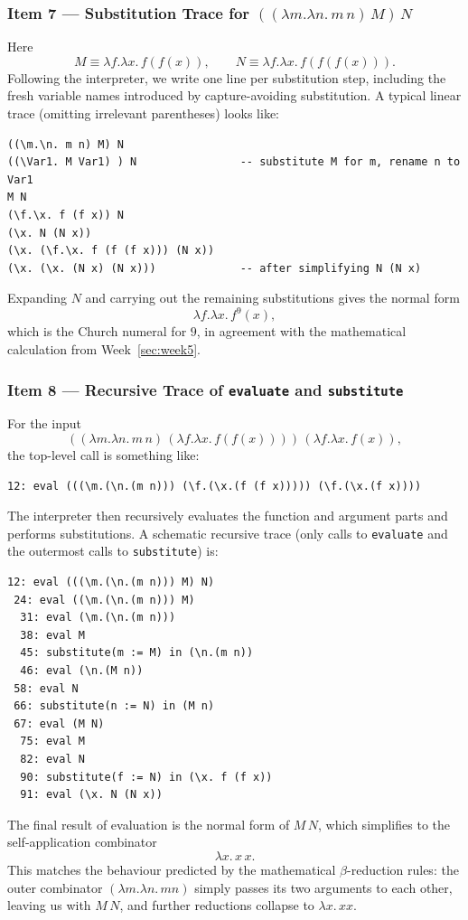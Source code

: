 \documentclass{article}
\theoremstyle{theorem}
\theoremstyle{definition}
\theoremstyle{remark}
\begin{document}
\subsubsection*{Item 7 --- Substitution Trace for \(((\lambda m.\lambda n.\, m\,n)\,M)\,N\)}
Here
\[
M \equiv \lambda f.\lambda x.\, f(f(x)),\qquad
N \equiv \lambda f.\lambda x.\, f(f(f(x))).
\]
Following the interpreter, we write one line per substitution step, including the fresh variable names introduced by capture-avoiding substitution. A typical linear trace (omitting irrelevant parentheses) looks like:
\begin{lstlisting}
((\m.\n. m n) M) N
((\Var1. M Var1) ) N                -- substitute M for m, rename n to Var1
M N
(\f.\x. f (f x)) N
(\x. N (N x))
(\x. (\f.\x. f (f (f x))) (N x))
(\x. (\x. (N x) (N x)))             -- after simplifying N (N x)
\end{lstlisting}
Expanding \(N\) and carrying out the remaining substitutions gives the normal form
\[
\lambda f.\lambda x.\, f^{9}(x),
\]
which is the Church numeral for \(9\), in agreement with the mathematical calculation from Week~\ref{sec:week5}.

\subsubsection*{Item 8 --- Recursive Trace of \texttt{evaluate} and \texttt{substitute}}
For the input
\[
((\lambda m.\lambda n.\, m\,n)\,(\lambda f.\lambda x.\, f(f(x))))\,
(\lambda f.\lambda x.\, f(x)),
\]
the top-level call is something like:
\begin{lstlisting}
12: eval (((\m.(\n.(m n))) (\f.(\x.(f (f x))))) (\f.(\x.(f x))))
\end{lstlisting}
The interpreter then recursively evaluates the function and argument parts and performs substitutions. A schematic recursive trace (only calls to \texttt{evaluate} and the outermost calls to \texttt{substitute}) is:
\begin{lstlisting}
12: eval (((\m.(\n.(m n))) M) N)
 24: eval ((\m.(\n.(m n))) M)
  31: eval (\m.(\n.(m n)))
  38: eval M
  45: substitute(m := M) in (\n.(m n))
  46: eval (\n.(M n))
 58: eval N
 66: substitute(n := N) in (M n)
 67: eval (M N)
  75: eval M
  82: eval N
  90: substitute(f := N) in (\x. f (f x))
  91: eval (\x. N (N x))
\end{lstlisting}
The final result of evaluation is the normal form of \(M\,N\), which simplifies to the self-application combinator
\[
\lambda x.\, x\,x.
\]
This matches the behaviour predicted by the mathematical \(\beta\)-reduction rules: the outer combinator \((\lambda m.\lambda n.\,m n)\) simply passes its two arguments to each other, leaving us with \(M\,N\), and further reductions collapse to \(\lambda x.\,x x\).
\end{document}
